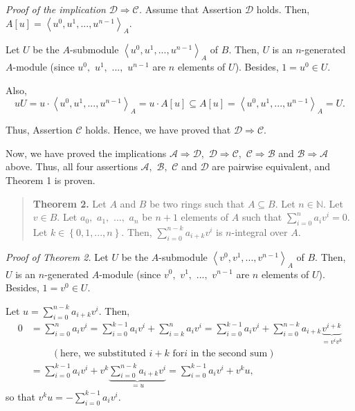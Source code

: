 \documentclass[12pt,final,notitlepage,onecolumn]{article}%
\begin{document}
\textit{Proof of the implication }$\mathcal{D}\Longrightarrow\mathcal{C}%
$\textit{.} Assume that Assertion $\mathcal{D}$ holds. Then, $A\left[
u\right]  =\left\langle u^{0},u^{1},...,u^{n-1}\right\rangle _{A}$.

Let $U$ be the $A$-submodule $\left\langle u^{0},u^{1},...,u^{n-1}%
\right\rangle _{A}$ of $B$. Then, $U$ is an $n$-generated $A$-module (since
$u^{0},$ $u^{1},$ $...,$ $u^{n-1}$ are $n$ elements of $U$). Besides,
$1=u^{0}\in U$.

Also,%
\[
uU=u\cdot\left\langle u^{0},u^{1},...,u^{n-1}\right\rangle _{A}=u\cdot
A\left[  u\right]  \subseteq A\left[  u\right]  =\left\langle u^{0}%
,u^{1},...,u^{n-1}\right\rangle _{A}=U.
\]


Thus, Assertion $\mathcal{C}$ holds. Hence, we have proved that $\mathcal{D}%
\Longrightarrow\mathcal{C}$.

Now, we have proved the implications $\mathcal{A}\Longrightarrow\mathcal{D},$
$\mathcal{D}\Longrightarrow\mathcal{C},$ $\mathcal{C}\Longrightarrow
\mathcal{B}$ and $\mathcal{B}\Longrightarrow\mathcal{A}$ above. Thus, all four
assertions $\mathcal{A},$ $\mathcal{B},$ $\mathcal{C}$ and $\mathcal{D}$ are
pairwise equivalent, and Theorem 1 is proven.

\begin{quote}
\textbf{Theorem 2.} Let $A$ and $B$ be two rings such that $A\subseteq B$. Let
$n\in\mathbb{N}$. Let $v\in B$. Let $a_{0},$ $a_{1},$ $...,$ $a_{n}$ be $n+1$
elements of $A$ such that $\sum\limits_{i=0}^{n}a_{i}v^{i}=0$. Let
$k\in\left\{  0,1,...,n\right\}  $. Then, $\sum\limits_{i=0}^{n-k}a_{i+k}%
v^{i}$ is $n$-integral over $A$.
\end{quote}

\textit{Proof of Theorem 2.} Let $U$ be the $A$-submodule $\left\langle
v^{0},v^{1},...,v^{n-1}\right\rangle _{A}$ of $B$. Then, $U$ is an
$n$-generated $A$-module (since $v^{0},$ $v^{1},$ $...,$ $v^{n-1}$ are $n$
elements of $U$). Besides, $1=v^{0}\in U$.

Let $u=\sum\limits_{i=0}^{n-k}a_{i+k}v^{i}$. Then,%
\begin{align*}
0  &  =\sum\limits_{i=0}^{n}a_{i}v^{i}=\sum\limits_{i=0}^{k-1}a_{i}v^{i}%
+\sum\limits_{i=k}^{n}a_{i}v^{i}=\sum\limits_{i=0}^{k-1}a_{i}v^{i}%
+\sum\limits_{i=0}^{n-k}a_{i+k}\underbrace{v^{i+k}}_{=v^{i}v^{k}}\\
&  \ \ \ \ \ \ \ \ \ \ \left(  \text{here, we substituted }i+k\text{ for
}i\text{\ in the second sum}\right) \\
&  =\sum\limits_{i=0}^{k-1}a_{i}v^{i}+v^{k}\underbrace{\sum\limits_{i=0}%
^{n-k}a_{i+k}v^{i}}_{=u}=\sum\limits_{i=0}^{k-1}a_{i}v^{i}+v^{k}u,
\end{align*}
so that $v^{k}u=-\sum\limits_{i=0}^{k-1}a_{i}v^{i}$.
\end{document}
